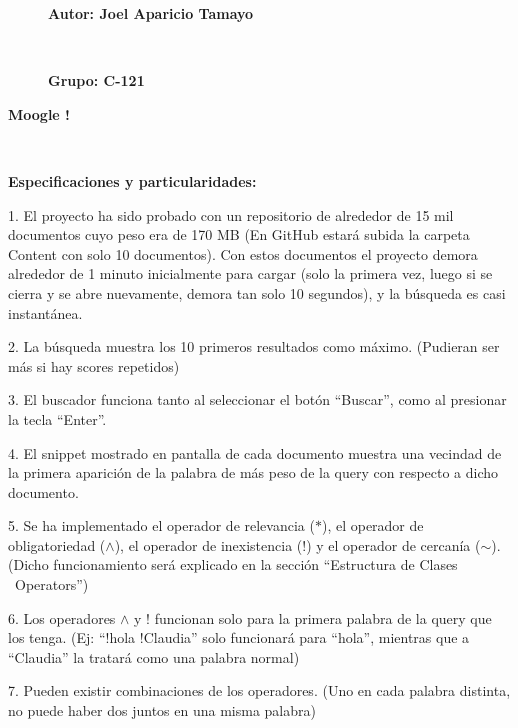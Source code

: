 \documentclass{article}
\begin{document}
\begin{figure}[b]
	\begin{flushleft}
			\textbf{\LARGE{Autor:} \Large{Joel Aparicio Tamayo}}


			\ 


			\textbf{\LARGE{Grupo:} \Large{C-121}}
	\end{flushleft}
\end{figure}



\newpage

\begin{center}
	\textbf{{\Huge {Moogle !}}}
\end{center}


\ 


\begin{center}
	\large\textbf{Especificaciones y particularidades:}
\end{center}


1. El proyecto ha sido probado con un repositorio de alrededor de 15 mil documentos cuyo peso
era de 170 MB (En GitHub estará subida la carpeta Content con solo 10 documentos). Con
estos documentos el proyecto demora alrededor de 1 minuto inicialmente para cargar (solo la
primera vez, luego si se cierra y se abre nuevamente, demora tan solo 10 segundos), y la
búsqueda es casi instantánea.

2. La búsqueda muestra los 10 primeros resultados como máximo. (Pudieran ser más si hay
scores repetidos)

3. El buscador funciona tanto al seleccionar el botón “Buscar”, como al presionar la tecla “Enter”.

4. El snippet mostrado en pantalla de cada documento muestra una vecindad de la primera
aparición de la palabra de más peso de la query con respecto a dicho documento.

5. Se ha implementado el operador de relevancia ($\ast$), el operador de obligatoriedad ({\tiny $\land $}), el
operador de inexistencia (!) y el operador de cercanía ($\sim $). (Dicho funcionamiento será
explicado en la sección “Estructura de Clases \ Operators”)

6. Los operadores {\tiny $\land $} y {!} funcionan solo para la primera palabra de la query que los tenga. (Ej:
“!hola {!}Claudia” solo funcionará para “hola”, mientras que a “Claudia” la tratará como una palabra
normal)

7. Pueden existir combinaciones de los operadores. (Uno en cada palabra distinta, no puede
haber dos juntos en una misma palabra)
\end{document}
